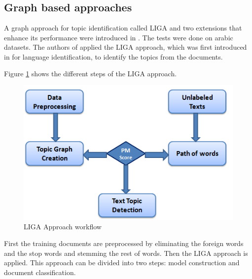 	  
\subsection{Graph based approaches}
A graph approach for topic identification called LIGA and two extensions that enhance its performance were introduced in \cite{a:arabic}. The tests were done on arabic datasets. 
The authors of \cite{a:arabic} applied the LIGA approach, which was first introduced in \cite{liga} for language identification, to identify the topics from the documents.

Figure \ref{liga} shows the different steps of the LIGA approach.

				\begin{figure}[h!]
					\centering
					\includegraphics[scale=0.7]{graphics/LIGA.PNG} 
					\caption{LIGA Approach workflow} \label{liga} 
				\end{figure} 
				First the training documents are preprocessed by eliminating the foreign words and the stop words and stemming the rest of words. Then the LIGA approach is applied. This approach can be divided into two steps: model construction and document classification.

